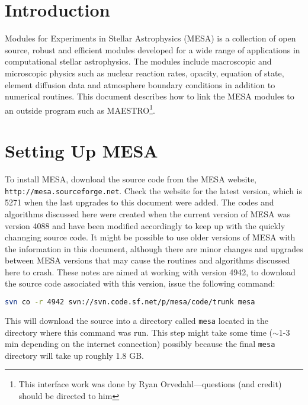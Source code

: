 
\section{Introduction}

Modules for Experiments in Stellar Astrophysics ({\sf MESA}) is a collection 
of open source, robust and efficient modules developed for a wide range of 
applications in computational stellar astrophysics. The modules include 
macroscopic and microscopic physics such as nuclear reaction rates, opacity, 
equation of state, element diffusion data and atmosphere boundary conditions 
in addition to numerical routines. This document describes how to link the 
{\sf MESA} modules to an outside program such as {\sf MAESTRO}\footnote{This
  interface work was done by Ryan Orvedahl---questions (and credit)
  should be directed to him}.


\section{Setting Up {\sf MESA}}
\label{sec:setupmesa}

To install {\sf MESA}, download the source code from the {\sf MESA} website, 
{\tt http://mesa.sourceforge.net}. Check the website for the latest version, 
which is 5271 when the last upgrades to this document were added. The codes 
and algorithms 
discussed here were created when the current version of {\sf MESA} was 
version 4088 and have been modified accordingly to keep up with the quickly 
channging source code. It might be possible to use older versions of 
{\sf MESA} with 
the information in this document, although there are minor changes and 
upgrades between {\sf MESA} versions that may cause the routines and algorithms 
discussed here to crash. These notes are aimed at working with 
version 4942, to download the source code associated with this version, 
issue the following command:
\begin{lstlisting}[language=bash,mathescape=false]
  svn co -r 4942 svn://svn.code.sf.net/p/mesa/code/trunk mesa
\end{lstlisting}
This will download the source into a directory called {\tt mesa} located 
in the directory where this command was run. This step might take some time 
($\sim$1-3 min depending on the internet connection) possibly because the 
final {\tt mesa} directory will take up roughly 1.8 GB.


